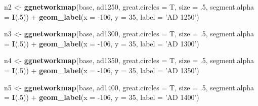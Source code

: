 \documentclass[]{article}
\newenvironment{Shaded}{\begin{snugshade}}{\end{snugshade}}
\newcommand{\KeywordTok}[1]{\textcolor[rgb]{0.13,0.29,0.53}{\textbf{{#1}}}}
\newcommand{\DataTypeTok}[1]{\textcolor[rgb]{0.13,0.29,0.53}{{#1}}}
\newcommand{\DecValTok}[1]{\textcolor[rgb]{0.00,0.00,0.81}{{#1}}}
\newcommand{\StringTok}[1]{\textcolor[rgb]{0.31,0.60,0.02}{{#1}}}
\newcommand{\NormalTok}[1]{{#1}}
\begin{document}
\begin{Shaded}
\begin{Highlighting}[]
\NormalTok{n2 <-}\StringTok{ }\KeywordTok{ggnetworkmap}\NormalTok{(base, ad1250, }\DataTypeTok{great.circles =} \NormalTok{T, }\DataTypeTok{size =} \NormalTok{.}\DecValTok{5}\NormalTok{, }\DataTypeTok{segment.alpha =} \KeywordTok{I}\NormalTok{(.}\DecValTok{5}\NormalTok{)) +}
\StringTok{  }\KeywordTok{geom_label}\NormalTok{(}\DataTypeTok{x =} \NormalTok{-}\DecValTok{106}\NormalTok{, }\DataTypeTok{y =} \DecValTok{35}\NormalTok{, }\DataTypeTok{label =} \StringTok{'AD 1250'}\NormalTok{)}

\NormalTok{n3 <-}\StringTok{ }\KeywordTok{ggnetworkmap}\NormalTok{(base, ad1300, }\DataTypeTok{great.circles =} \NormalTok{T, }\DataTypeTok{size =} \NormalTok{.}\DecValTok{5}\NormalTok{, }\DataTypeTok{segment.alpha =} \KeywordTok{I}\NormalTok{(.}\DecValTok{5}\NormalTok{)) +}
\StringTok{  }\KeywordTok{geom_label}\NormalTok{(}\DataTypeTok{x =} \NormalTok{-}\DecValTok{106}\NormalTok{, }\DataTypeTok{y =} \DecValTok{35}\NormalTok{, }\DataTypeTok{label =} \StringTok{'AD 1300'}\NormalTok{)}

\NormalTok{n4 <-}\StringTok{ }\KeywordTok{ggnetworkmap}\NormalTok{(base, ad1350, }\DataTypeTok{great.circles =} \NormalTok{T, }\DataTypeTok{size =} \NormalTok{.}\DecValTok{5}\NormalTok{, }\DataTypeTok{segment.alpha =} \KeywordTok{I}\NormalTok{(.}\DecValTok{5}\NormalTok{)) +}
\StringTok{  }\KeywordTok{geom_label}\NormalTok{(}\DataTypeTok{x =} \NormalTok{-}\DecValTok{106}\NormalTok{, }\DataTypeTok{y =} \DecValTok{35}\NormalTok{, }\DataTypeTok{label =} \StringTok{'AD 1350'}\NormalTok{)}

\NormalTok{n5 <-}\StringTok{ }\KeywordTok{ggnetworkmap}\NormalTok{(base, ad1400, }\DataTypeTok{great.circles =} \NormalTok{T, }\DataTypeTok{size =} \NormalTok{.}\DecValTok{5}\NormalTok{, }\DataTypeTok{segment.alpha =} \KeywordTok{I}\NormalTok{(.}\DecValTok{5}\NormalTok{)) +}
\StringTok{  }\KeywordTok{geom_label}\NormalTok{(}\DataTypeTok{x =} \NormalTok{-}\DecValTok{106}\NormalTok{, }\DataTypeTok{y =} \DecValTok{35}\NormalTok{, }\DataTypeTok{label =} \StringTok{'AD 1400'}\NormalTok{)}


\end{Highlighting}
\end{Shaded}
\end{document}
